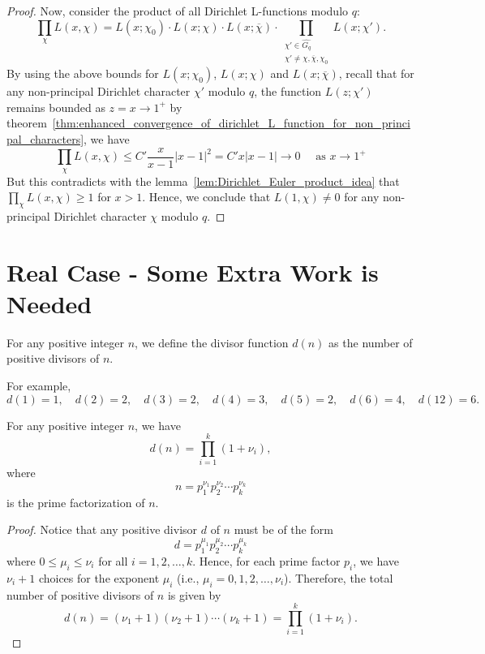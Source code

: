 \documentclass{elegantbook}
\begin{document}
\begin{proof}
  Now, consider the product of all Dirichlet L-functions modulo \(q\):
  \[
    \prod_{\chi} L(x,\chi) = L(x;\chi_0) \cdot L(x;\chi) \cdot L(x;\overline{\chi}) \cdot \prod_{\substack{\chi' \in \widehat{G_q} \\ \chi' \ne \chi, \overline{\chi}, \chi_0}} L(x;\chi').
  \]
  By using the above bounds for \(L(x;\chi_0)\), \(L(x;\chi)\) and \(L(x;\overline{\chi})\), recall that for any non-principal Dirichlet character \(\chi'\) modulo \(q\), the function \(L(z;\chi')\) remains bounded as \(z=x \to 1^{+}\) by theorem~\ref{thm:enhanced_convergence_of_dirichlet_L_function_for_non_principal_characters}, we have
  \[
    \prod_{\chi} L(x,\chi) \leq C' \frac{x}{x-1} |x-1|^2= C' x|x-1| \to 0 \quad \text{ as } x \to 1^{+}
  \]
  But this contradicts with the lemma~\ref{lem:Dirichlet_Euler_product_idea} that \(\prod_{\chi} L(x,\chi) \geq 1\) for \(x > 1\). Hence, we conclude that \(L(1,\chi) \ne 0\) for any non-principal Dirichlet character \(\chi\) modulo \(q\).
\end{proof}

\section{Real Case - Some Extra Work is Needed}

\begin{definition} \label{def:divisor_function}
  For any positive integer \(n\), we define the divisor function \( d(n) \) as the number of positive divisors of \(n\).
  
  For example,
  \[
    d(1) = 1, \quad d(2) = 2, \quad d(3) = 2, \quad d(4) = 3, \quad d(5) = 2, \quad d(6) = 4, \quad d(12) = 6.
  \]
\end{definition}

\begin{theorem} \label{thm:formula_for_divisor_function}
  For any positive integer \(n\), we have
  \[
    d(n) = \prod_{i=1}^{k} (1 + \nu_i),
  \]
  where
  \[
    n = p_1^{\nu_1} p_2^{\nu_2} \cdots p_k^{\nu_k}
  \]
  is the prime factorization of \(n\).
\end{theorem}

\begin{proof}
  Notice that any positive divisor \(d\) of \(n\) must be of the form
  \[
    d = p_1^{\mu_1} p_2^{\mu_2} \cdots p_k^{\mu_k}
  \]
  where \(0 \leq \mu_i \leq \nu_i\) for all \(i=1,2,\ldots,k\). Hence, for each prime factor \(p_i\), we have \(\nu_i + 1\) choices for the exponent \(\mu_i\) (i.e., \(\mu_i = 0, 1, 2, \ldots, \nu_i\)). Therefore, the total number of positive divisors of \(n\) is given by
  \[
    d(n) = (\nu_1 + 1)(\nu_2 + 1) \cdots (\nu_k + 1) = \prod_{i=1}^{k} (1 + \nu_i).
  \]
\end{proof}
\end{document}
